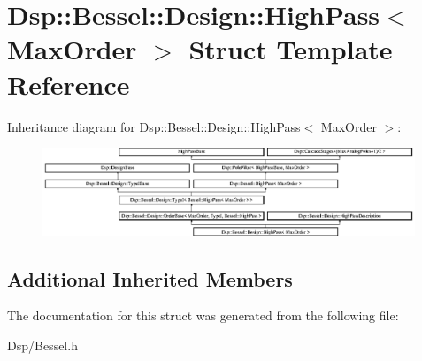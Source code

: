 \hypertarget{structDsp_1_1Bessel_1_1Design_1_1HighPass}{\section{Dsp\-:\-:Bessel\-:\-:Design\-:\-:High\-Pass$<$ Max\-Order $>$ Struct Template Reference}
\label{structDsp_1_1Bessel_1_1Design_1_1HighPass}
}
Inheritance diagram for Dsp\-:\-:Bessel\-:\-:Design\-:\-:High\-Pass$<$ Max\-Order $>$\-:\begin{figure}[H]
\begin{center}
\leavevmode
\includegraphics[height=2.635294cm]{structDsp_1_1Bessel_1_1Design_1_1HighPass}
\end{center}
\end{figure}
\subsection*{Additional Inherited Members}


The documentation for this struct was generated from the following file\-:\begin{DoxyCompactItemize}
\item 
Dsp/Bessel.\-h\end{DoxyCompactItemize}
